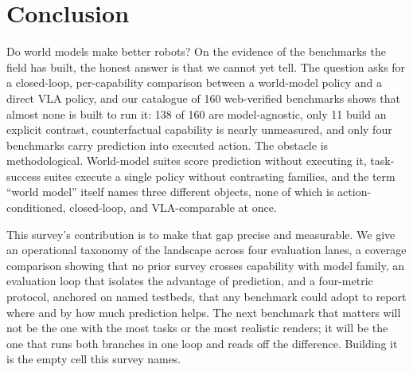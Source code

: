 \section{Conclusion}
\label{sec:conclusion}

Do world models make better robots? On the evidence of the benchmarks the field has built, the honest
answer is that we cannot yet tell. The question asks for a closed-loop, per-capability comparison
between a world-model policy and a direct VLA policy, and our catalogue of 160 web-verified benchmarks
shows that almost none is built to run it: 138 of 160 are model-agnostic, only 11 build an explicit
contrast, counterfactual capability is nearly unmeasured, and only four benchmarks carry prediction
into executed action. The obstacle is methodological. World-model suites score prediction without
executing it, task-success suites execute a single policy without contrasting families, and the term
``world model'' itself names three different objects, none of which is action-conditioned,
closed-loop, and VLA-comparable at once.

This survey's contribution is to make that gap precise and measurable. We give an operational
taxonomy of the landscape across four evaluation lanes, a coverage comparison showing that no prior
survey crosses capability with model family, an evaluation loop that isolates the advantage of
prediction, and a four-metric protocol, anchored on named testbeds, that any benchmark could adopt to
report where and by how much prediction helps. The next benchmark that matters will not be the one
with the most tasks or the most realistic renders; it will be the one that runs both branches in one
loop and reads off the difference. Building it is the empty cell this survey names.
